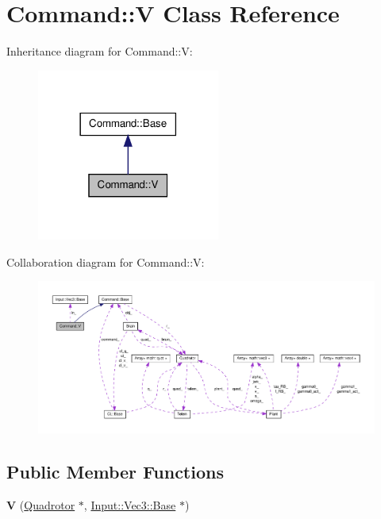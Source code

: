 \hypertarget{classCommand_1_1V}{\section{\-Command\-:\-:\-V \-Class \-Reference}
\label{classCommand_1_1V}
}


\-Inheritance diagram for \-Command\-:\-:\-V\-:\nopagebreak
\begin{figure}[H]
\begin{center}
\leavevmode
\includegraphics[width=170pt]{classCommand_1_1V__inherit__graph}
\end{center}
\end{figure}


\-Collaboration diagram for \-Command\-:\-:\-V\-:\nopagebreak
\begin{figure}[H]
\begin{center}
\leavevmode
\includegraphics[width=350pt]{classCommand_1_1V__coll__graph}
\end{center}
\end{figure}
\subsection*{\-Public \-Member \-Functions}
\begin{DoxyCompactItemize}
\item 
\hypertarget{classCommand_1_1V_ab0f8e91d15ed03f3b5320314575c65ff}{{\bfseries \-V} (\hyperlink{classQuadrotor}{\-Quadrotor} $\ast$, \hyperlink{classInput_1_1Vec3_1_1Base}{\-Input\-::\-Vec3\-::\-Base} $\ast$)}\label{classCommand_1_1V_ab0f8e91d15ed03f3b5320314575c65ff}

\end{DoxyCompactItemize}
